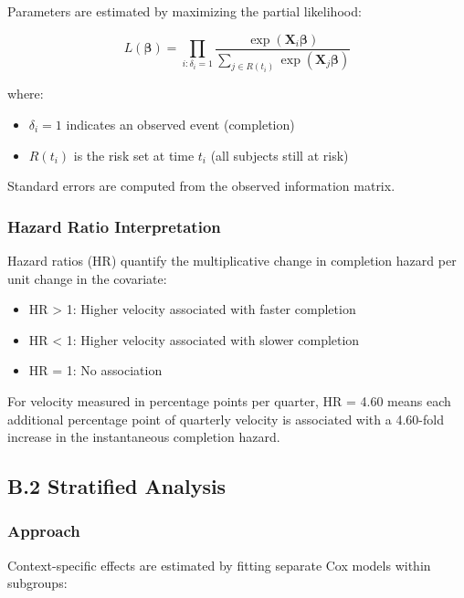 \documentclass[
  12pt,
  letterpaper,
]{article}
\providecommand{\tightlist}{%
  \setlength{\itemsep}{0pt}\setlength{\parskip}{0pt}}
\begin{document}
Parameters are estimated by maximizing the partial likelihood:

\[
L(\boldsymbol{\beta}) = \prod_{i: \delta_i = 1} \frac{\exp(\mathbf{X}_i \boldsymbol{\beta})}{\sum_{j \in R(t_i)} \exp(\mathbf{X}_j \boldsymbol{\beta})}
\]

where:

\begin{itemize}
\tightlist
\item
  \(\delta_i = 1\) indicates an observed event (completion)
\item
  \(R(t_i)\) is the risk set at time \(t_i\) (all subjects still at
  risk)
\end{itemize}

Standard errors are computed from the observed information matrix.

\subsubsection{Hazard Ratio
Interpretation}\label{hazard-ratio-interpretation}

Hazard ratios (HR) quantify the multiplicative change in completion
hazard per unit change in the covariate:

\begin{itemize}
\tightlist
\item
  HR \textgreater{} 1: Higher velocity associated with faster completion
\item
  HR \textless{} 1: Higher velocity associated with slower completion
\item
  HR = 1: No association
\end{itemize}

For velocity measured in percentage points per quarter, HR = 4.60 means
each additional percentage point of quarterly velocity is associated
with a 4.60-fold increase in the instantaneous completion hazard.

\subsection{B.2 Stratified Analysis}\label{b.2-stratified-analysis}

\subsubsection{Approach}\label{approach}

Context-specific effects are estimated by fitting separate Cox models
within subgroups:
\end{document}
